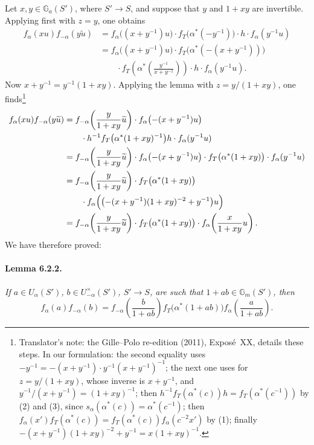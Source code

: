 Let \(x,y\in\mathbb G_a(S')\), where \(S'\to S\), and suppose that
\(y\) and \(1+xy\) are invertible.  Applying  first with
\(z=y\), one obtains
\[
\begin{aligned}
 f_\alpha(xu)f_{-\alpha}(y\widetilde u)
 &=f_\alpha\bigl((x+y^{-1})u\bigr)\cdot
   f_T\bigl(\alpha^\ast(-y^{-1})\bigr)\cdot h\cdot f_\alpha(y^{-1}u)\\
 &=f_\alpha\bigl((x+y^{-1})u\bigr)\cdot
   f_T\bigl(\alpha^\ast(-(x+y^{-1}))\bigr)\\
 &\qquad{}\cdot
   f_T\!\left(\alpha^\ast\!\left(\frac{y^{-1}}{x+y^{-1}}\right)\right)
   \cdot h\cdot f_\alpha(y^{-1}u).
\end{aligned}
\]
Now \(x+y^{-1}=y^{-1}(1+xy)\).  Applying the lemma with
\(z=y/(1+xy)\), one finds\footnote{Translator's note: the Gille--Polo re-edition (2011), Exposé~XX, details these steps. In our formulation:
the second equality uses \(-y^{-1}=-(x+y^{-1})\cdot y^{-1}(x+y^{-1})^{-1}\); the next one uses
 for \(z=y/(1+xy)\), whose inverse is \(x+y^{-1}\), and
\(y^{-1}/(x+y^{-1})=(1+xy)^{-1}\); then \(h^{-1}f_T(\alpha^\ast(c))h=f_T(\alpha^\ast(c^{-1}))\) by
\textup{(2)} and \textup{(3)}, since \(s_\alpha(\alpha^\ast(c))=\alpha^\ast(c^{-1})\); then
\(f_\alpha(x')f_T(\alpha^\ast(c))=f_T(\alpha^\ast(c))f_\alpha(c^{-2}x')\) by \textup{(1)}; finally
\(-(x+y^{-1})(1+xy)^{-2}+y^{-1}=x(1+xy)^{-1}\).}
\[
\begin{aligned}
 f_\alpha(xu)f_{-\alpha}(y\widetilde u)
 &=f_{-\alpha}\!\left(\frac{y}{1+xy}\widetilde u\right)\cdot
   f_\alpha\bigl(-(x+y^{-1})u\bigr)\\
 &\qquad{}\cdot h^{-1}f_T\bigl(\alpha^\ast(1+xy)^{-1}\bigr)h\cdot
   f_\alpha(y^{-1}u)\\
 &=f_{-\alpha}\!\left(\frac{y}{1+xy}\widetilde u\right)\cdot
   f_\alpha\bigl(-(x+y^{-1})u\bigr)\cdot
   f_T\bigl(\alpha^\ast(1+xy)\bigr)\cdot
   f_\alpha(y^{-1}u)\\
 &=f_{-\alpha}\!\left(\frac{y}{1+xy}\widetilde u\right)\cdot
   f_T\bigl(\alpha^\ast(1+xy)\bigr)\\
 &\qquad{}\cdot
   f_\alpha\Bigl(\bigl(-(x+y^{-1})(1+xy)^{-2}+y^{-1}\bigr)u\Bigr)\\
 &=f_{-\alpha}\!\left(\frac{y}{1+xy}\widetilde u\right)\cdot
   f_T\bigl(\alpha^\ast(1+xy)\bigr)\cdot
   f_\alpha\!\left(\frac{x}{1+xy}u\right).
\end{aligned}
\]
We have therefore proved:

\paragraph{\textbf{Lemma 6.2.2.}}
\emph{If \(a\in U_\alpha(S')\), \(b\in U_{-\alpha}^\times(S')\),
\(S'\to S\), are such that \(1+ab\in\mathbb G_m(S')\), then}
\[
 f_\alpha(a)f_{-\alpha}(b)
 =
 f_{-\alpha}\!\left(\frac{b}{1+ab}\right)
 f_T\bigl(\alpha^\ast(1+ab)\bigr)
 f_\alpha\!\left(\frac{a}{1+ab}\right).
\]

